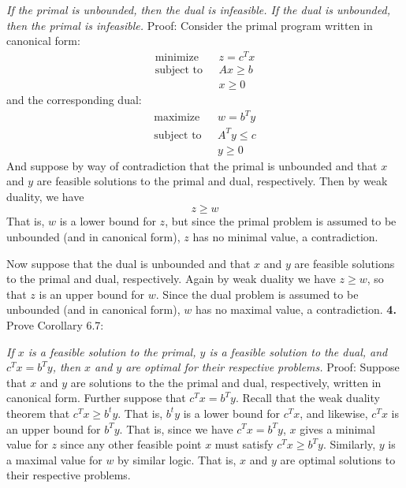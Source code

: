 \documentclass{article}
\begin{document}
\textit{If the primal is unbounded, then the dual is infeasible. If the dual is unbounded, then the primal is infeasible.}
\newline\newline
Proof: Consider the primal program written in canonical form:
\begin{align*}
    \text{minimize}\:\:\: &z = c^Tx\\
    \text{subject to} \:\:\: &Ax \geq b\\
    &x \geq 0
\end{align*}
and the corresponding dual:
\begin{align*}
    \text{maximize}\:\:\: &w= b^Ty\\
    \text{subject to} \:\:\: &A^Ty \leq c\\
    &y \geq 0
\end{align*}
And suppose by way of contradiction that the primal is unbounded and that $x$ and $y$ are feasible solutions to the primal and dual, respectively. Then by weak duality, we have 
\[z \geq w\]
That is, $w$ is a lower bound for $z$, but since the primal problem is assumed to be unbounded (and in canonical form), $z$ has no minimal value, a contradiction.
\newline

Now suppose that the dual is unbounded and that $x$ and $y$ are feasible solutions to the primal and dual, respectively. Again by weak duality we have $z \geq w$, so that $z$ is an upper bound for $w$. Since the dual problem is assumed to be unbounded (and in canonical form), $w$ has no maximal value, a contradiction.
\newline\newline\newline
\textbf{4.} Prove Corollary 6.7:
\newline

\textit{If $x$ is a feasible solution to the primal, $y$ is a feasible solution to the dual, and $c^Tx = b^Ty$, then $x$ and $y$ are optimal for their respective problems.}
\newline\newline
Proof: Suppose that $x$ and $y$ are solutions to the the primal and dual, respectively, written in canonical form. Further suppose that $c^Tx = b^Ty$. Recall that the weak duality theorem that $c^Tx \geq b^ty$. That is, $b^ty$ is a lower bound for $c^Tx$, and likewise, $c^Tx$ is an upper bound for $b^Ty$. That is, since we have $c^Tx = b^Ty$, $x$ gives a minimal value for $z$ since any other feasible point $x$ must satisfy $c^Tx \geq b^Ty$. Similarly, $y$ is a maximal value for $w$ by similar logic. That is, $x$ and $y$ are optimal solutions to their respective problems.
\end{document}
